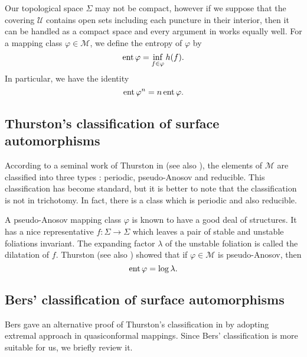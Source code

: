 \documentclass[11pt,reqno]{amsart}
\numberwithin{equation}{section}
\begin{document}
Our topological space  $\varSigma$  may not be compact, 
however if we suppose that the covering  $\mathcal{U}$  contains  
open sets including each puncture in their interior, 
then it can be handled as a compact space and 
every argument in  \cite{AKM}  works equally well.  
For a mapping class  $\varphi \in \mathcal{M}$, 
we define the entropy of  $\varphi$  by 
\begin{equation*}
	{\rm ent} \, \varphi = \inf_{f \in \varphi} h(f).  
\end{equation*}
In particular, 
we have the identity 
\begin{equation}\label{Eq:Entropy} 
	{\rm ent} \, \varphi^n = n \, {\rm ent} \, \varphi. 
\end{equation}

\subsection{Thurston's classification of surface automorphisms}  

According to a seminal work of Thurston in \cite{Thurston2} (see also \cite{FLP}), 
the elements of  $\mathcal{M}$  are classified into three types : 
periodic, pseudo-Anosov and reducible.  
This classification has become standard, 
but it is better to note that the classification is not in trichotomy.  
In fact, 
there is a class which is periodic and also reducible.  

A pseudo-Anosov mapping class  $\varphi$  is known to have a good deal of structures.  
It has a nice representative  $f : \varSigma \to \varSigma$  which 
leaves a pair of stable and unstable foliations invariant.  
The expanding factor  $\lambda$  of the unstable foliation is called 
the dilatation of  $f$. 
Thurston \cite{Thurston2} (see also \cite{FLP})  showed that 
if  $\varphi \in \mathcal{M}$  is pseudo-Anosov, 
then 
\begin{equation*}
	{\rm ent} \, \varphi = \log \lambda.  
\end{equation*} 

\subsection{Bers' classification of surface automorphisms} 

Bers gave an alternative proof of Thurston's classification in  \cite{Bers}   
by adopting extremal approach in quasiconformal mappings. 
Since Bers' classification is more suitable for us, 
we briefly review it. 
\end{document}
